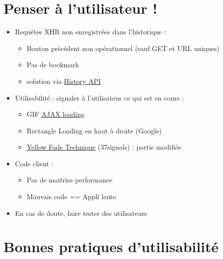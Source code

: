 \hypertarget{penser-uxe0-lutilisateur}{%
\section{Penser à l'utilisateur !}\label{penser-uxe0-lutilisateur}}

\begin{itemize}
\tightlist
\item
  Requêtes XHR non enregistrées dans l'historique :

  \begin{itemize}
  \tightlist
  \item
    Bouton précédent non opérationnel (sauf GET et URL uniques)
  \item
    Pas de bookmark
  \item
    solution via
    \href{http://w3c.github.io/html/browsers.html\#session-history-and-navigation}{History
    API}
  \end{itemize}
\item
  Utilisabilité : signaler à l'utilisateur ce qui est en cours :

  \begin{itemize}
  \tightlist
  \item
    GIF \href{http://www.ajaxload.info/}{AJAX loading}
  \item
    Rectangle Loading en haut à droite (Google)
  \item
    \href{https://signalvnoise.com/archives/000558.php}{Yellow Fade
    Technique} (37signals) : partie modifiée
  \end{itemize}
\item
  Code client :

  \begin{itemize}
  \tightlist
  \item
    Pas de maitrise performance
  \item
    Mauvais code == Appli lente
  \end{itemize}
\item
  En cas de doute, faire tester des utilisateurs
\end{itemize}

\hypertarget{bonnes-pratiques-dutilisabilituxe9}{%
\section{Bonnes pratiques
d'utilisabilité}\label{bonnes-pratiques-dutilisabilituxe9}}

